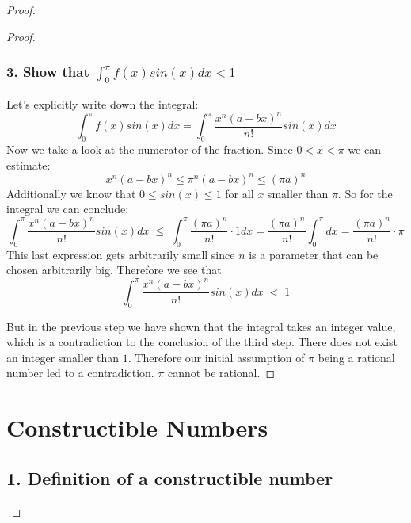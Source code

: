 \documentclass{article}
\theoremstyle{definition}
\begin{document}
\begin{proof}
\begin{proof}
\subsubsection*{3. Show that $\int_0^{\pi}f(x)sin(x)dx<1$}
Let's explicitly write down the integral:
\begin{equation}
    \int_0^{\pi}f(x)sin(x)dx = \int_0^{\pi} \frac{x^n(a-bx)^n}{n!}  sin(x)dx
\end{equation}
Now we take a look at the numerator of the fraction. Since $0<x<\pi$ we can estimate:
\begin{equation}
    x^n(a-bx)^n \leq \pi^n (a-bx)^n \leq (\pi a)^n
\end{equation}
Additionally we know that $0 \leq sin(x)\leq 1$ for all $x$ smaller than $\pi$. So for the integral we can conclude:
\begin{equation}
    \int_0^{\pi} \frac{x^n(a-bx)^n}{n!}  sin(x)dx\;  \leq \;  \int_0^{\pi} \frac{(\pi a )^n}{n!}\cdot 1 dx = \frac{(\pi a )^n}{n!} \int_0^{\pi} dx = \frac{(\pi a )^n}{n!}\cdot \pi 
\end{equation}
This last expression gets arbitrarily small since $n$ is a parameter that can be chosen arbitrarily big. Therefore we see that
\begin{equation}
     \int_0^{\pi} \frac{x^n(a-bx)^n}{n!}  sin(x)dx\;  < \; 1
\end{equation}

But in the previous step we have shown that the integral takes an integer value, which is a contradiction to the conclusion of the third step. There does not exist an integer smaller than $1$. Therefore our initial assumption of $\pi$ being a rational number led to a contradiction. $\pi$ cannot be rational.























\end{proof}


\newpage

\section{Constructible Numbers}
\subsection{1. Definition of a constructible number}

\end{proof}
\end{document}
